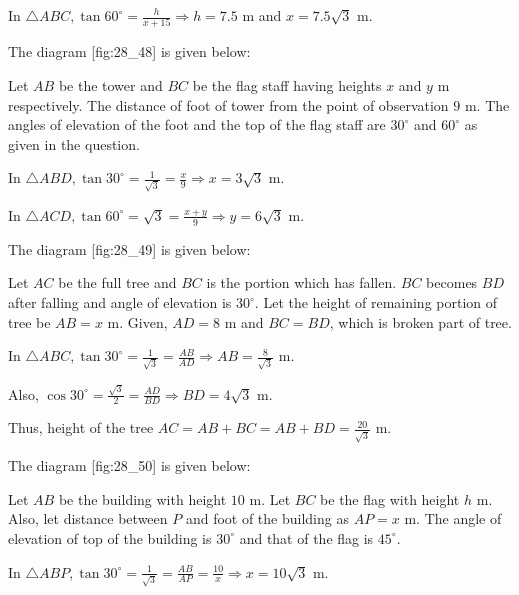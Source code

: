   In $\triangle ABC, \tan60^\circ = \frac{h}{x + 15}\Rightarrow h = 7.5$ m and $x = 7.5\sqrt{3}$ m.

\item The diagram [fig:28_48] is given below:

  \startplacefigure[reference=fig:28_48]
    \externalfigure[28_48.pdf]
  \stopplacefigure

  Let $AB$ be the tower and $BC$ be the flag staff having heights $x$ and $y$ m respectively. The distance
  of foot of tower from the point of observation $9$ m. The angles of elevation of the foot and the top of the flag staff
  are $30^\circ$ and $60^\circ$ as given in the question.

  In $\triangle ABD, \tan30^\circ = \frac{1}{\sqrt{3}} = \frac{x}{9}\Rightarrow x = 3\sqrt{3}$ m.

  In $\triangle ACD, \tan60^\circ = \sqrt{3} = \frac{x + y}{9} \Rightarrow y = 6\sqrt{3}$ m.

\item The diagram [fig:28_49] is given below:

  \startplacefigure[reference=fig:28_49]
    \externalfigure[28_49.pdf]
  \stopplacefigure

  Let $AC$ be the full tree and $BC$ is the portion which has fallen. $BC$ becomes $BD$ after falling and
  angle of elevation is $30^\circ$. Let the height of remaining portion of tree be $AB = x$ m. Given, $AD = 8$
  m and $BC = BD$, which is broken part of tree.

  In $\triangle ABC, \tan30^\circ = \frac{1}{\sqrt{3}} = \frac{AB}{AD} \Rightarrow AB = \frac{8}{\sqrt{3}}$ m.

  Also, $\cos30^\circ = \frac{\sqrt{3}}{2} = \frac{AD}{BD} \Rightarrow BD = 4\sqrt{3}$ m.

  Thus, height of the tree $AC = AB + BC = AB + BD = \frac{20}{\sqrt{3}}$ m.

\item The diagram [fig:28_50] is given below:

  \startplacefigure[reference=fig:28_50]
    \externalfigure[28_50.pdf]
  \stopplacefigure

  Let $AB$ be the building with height $10$ m. Let $BC$ be the flag with height $h$ m. Also, let distance
  between $P$ and foot of the building as $AP = x$ m. The angle of elevation of top of the building is
  $30^\circ$ and that of the flag is $45^\circ$.

  In $\triangle ABP, \tan30^\circ = \frac{1}{\sqrt{3}} = \frac{AB}{AP} = \frac{10}{x} \Rightarrow x = 10\sqrt{3}$ m.

